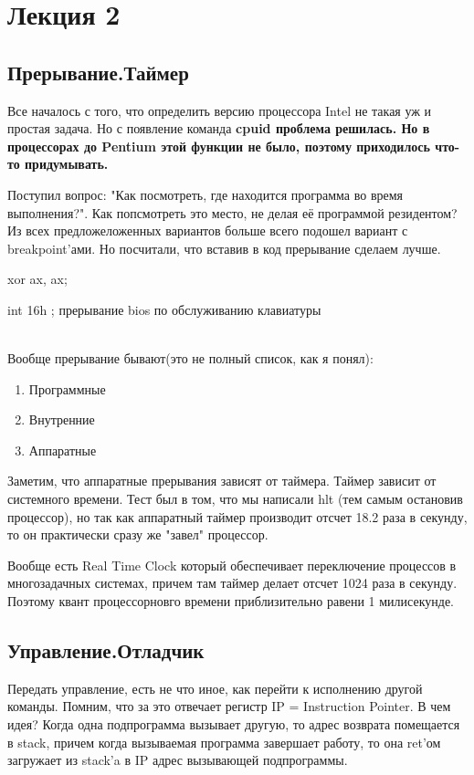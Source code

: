 \section{Лекция 2}
\subsection{Прерывание.Таймер}
Все началось с того, что определить версию процессора Intel не такая уж и простая задача. Но с появление команда \bfseries cpuid \mdseries проблема решилась. 
Но в процессорах до Pentium этой функции не было, поэтому приходилось что-то придумывать. 

Поступил вопрос: "Как посмотреть, где находится программа во время выполнения?". Как попсмотреть это место, не делая её программой резидентом? Из всех предложеложенных вариантов больше всего подошел вариант с breakpoint'ами. Но посчитали, что вставив в код прерывание сделаем лучше.

xor ax, ax;

int 16h   ; прерывание bios по обслуживанию клавиатуры

~\\

Вообще прерывание бывают(это не полный список, как я понял):
\begin{enumerate}
\item Программные
\item Внутренние
\item Аппаратные 
\end{enumerate}
Заметим, что аппаратные прерывания зависят от таймера. Таймер зависит от системного времени. 
Тест был в том, что мы написали hlt (тем самым остановив процессор), но так как аппаратный таймер производит отсчет 18.2 раза в секунду, то он практически сразу же "завел" процессор. 

Вообще есть Real Time Clock который обеспечивает переключение процессов в многозадачных системах, причем там таймер делает отсчет 1024 раза в секунду. Поэтому квант процессорновго времени приблизительно равени 1 милисекунде.

\subsection{Управление.Отладчик}
Передать управление, есть не что иное, как перейти к исполнению другой команды. Помним, что за это отвечает регистр IP = Instruction Pointer. В чем идея? Когда одна подпрограмма вызывает другую, то адрес возврата помещается в stack, причем когда вызываемая программа завершает работу, то она ret'ом загружает из stack'a в IP адрес вызывающей подпрограммы.

